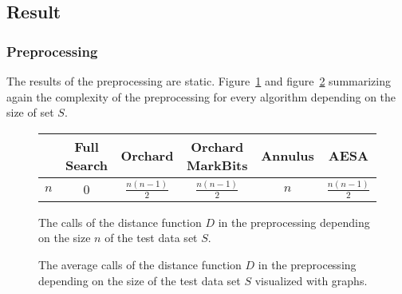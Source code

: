 \documentclass[runningheads,a4paper]{llncs}
\begin{document}
\subsection{Result}

\subsubsection{Preprocessing}

The results of the preprocessing are static. Figure~\ref{fig:preprocessing:tabular} and
figure~\ref{fig:preprocessing:graph} summarizing again the complexity of the preprocessing for every algorithm
depending on the size of set $S$.

\begin{figure}
	\begin{center}
		\begin{tabular}{| l | c | c | c | c | c |}
			\hline
		  	& Full Search & Orchard & Orchard MarkBits & Annulus & AESA \\ \hline
		  	$n$ & 0 & $\frac{n(n-1)}{2}$ & $\frac{n(n-1)}{2}$ & $n$ & $\frac{n(n-1)}{2}$ \\ \hline
		\end{tabular}
	\end{center}
	\caption{The calls of the distance function $D$ in the preprocessing depending on the size $n$ of the test data set
		$S$.}
	\label{fig:preprocessing:tabular}
\end{figure}

\begin{figure}
	\begin{center}
	\end{center}
	\caption{The average calls of the distance function $D$ in the preprocessing depending on the size of the test data
		set $S$ visualized with graphs.}
	\label{fig:preprocessing:graph}
\end{figure}
\end{document}
